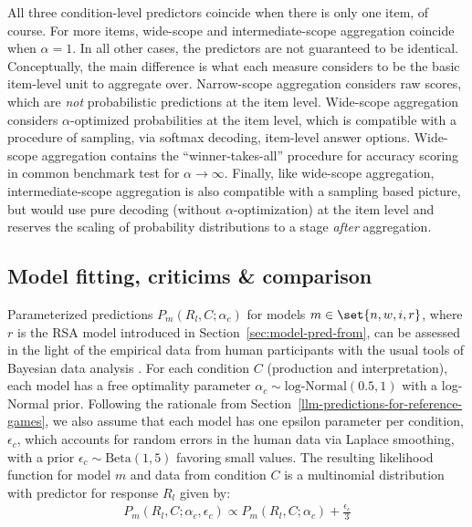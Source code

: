 \documentclass[fleqn]{article}
\begin{document}
All three condition-level predictors coincide when there is only one item, of course.
For more items, wide-scope and intermediate-scope aggregation coincide when $\alpha = 1$.
In all other cases, the predictors are not guaranteed to be identical.
Conceptually, the main difference is what each measure considers to be the basic item-level unit to aggregate over.
Narrow-scope aggregation considers raw scores, which are \emph{not} probabilistic predictions at the item level.
Wide-scope aggregation considers $\alpha$-optimized probabilities at the item level, which is compatible with a procedure of sampling, via softmax decoding, item-level answer options.
Wide-scope aggregation contains the ``winner-takes-all'' procedure for accuracy scoring in common benchmark test for $\alpha \rightarrow \infty$.
Finally, like wide-scope aggregation, intermediate-scope aggregation is also compatible with a sampling based picture, but would use pure decoding (without $\alpha$-optimization) at the item level and reserves the scaling of probability distributions to a stage \emph{after} aggregation.

\subsection{Model fitting, criticims \& comparison}
\label{sec:model-fitting}

Parameterized predictions $P_{m}(R_{l}, C ; \alpha_{c})$ for models $m \in \set{n,w,i,r}$, where $r$ is the RSA model introduced in Section~\ref{sec:model-pred-from}, can be assessed in the light of the empirical data from human participants with the usual tools of Bayesian data analysis \citep[e.g.][]{GelmanCarlin2014:Bayesian-Data-A,McElreath2016:Statistical-Ret,Lambert2018:A-Students-Guid}.
For each condition $C$ (production and interpretation), each model has a free optimality parameter $\alpha_{c}\sim \text{log-Normal}(0.5,1)$ with a log-Normal prior.
Following the rationale from Section~\ref{llm-predictions-for-reference-games}, we also assume that each model has one epsilon parameter per condition, $\epsilon_{c}$, which accounts for random errors in the human data via Laplace smoothing, with a prior $\epsilon_{c} \sim \text{Beta}(1,5)$ favoring small values.
The resulting likelihood function for model $m$ and data from condition $C$ is a multinomial distribution with predictor for response $R_{l}$ given by:
%
\begin{align*}
  P_{m}(R_{l}, C; \alpha_{c}, \epsilon_{c}) \propto P_{m}(R_{l}, C; \alpha_{c}) +  \frac{\epsilon_{c}}{3}
\end{align*}
\end{document}
